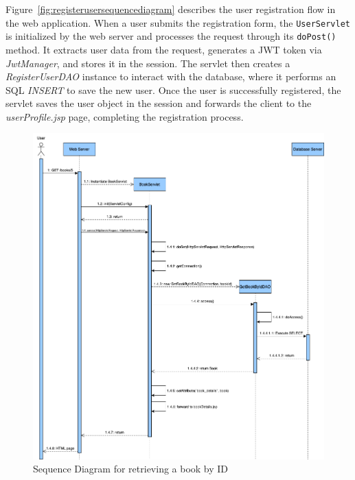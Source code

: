 Figure~\ref{fig:registerusersequencediagram} describes the user registration flow in the web application. When a user submits the registration form, the \texttt{UserServlet}  is initialized by the web server and processes the request through its \texttt{doPost()} method. It extracts user data from the request, generates a JWT token via \textit{JwtManager}, and stores it in the session. The servlet then creates a \textit{RegisterUserDAO} instance to interact with the database, where it performs an SQL \textit{INSERT} to save the new user. Once the user is successfully registered, the servlet saves the user object in the session and forwards the client to the \textit{userProfile.jsp} page, completing the registration process.


\clearpage
\begin{figure}[h!]
    \centering
    \includegraphics[width=\textwidth]{photos/SequenceDiagram.png}
    \caption{Sequence Diagram for retrieving a book by ID}
    \label{fig:sequencediagram}
\end{figure}


